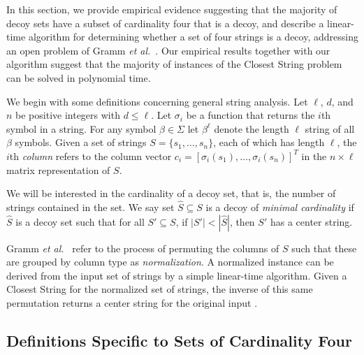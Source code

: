 In this section, we provide empirical evidence suggesting that the majority of decoy sets have a subset of cardinality four that is a decoy, and describe a linear-time algorithm for determining whether a set of four strings is a decoy, addressing an open problem of Gramm {\em et al.}\ \cite{GNR03}. Our empirical results together with our algorithm suggest that the majority of instances of the {\sc Closest String} problem can be solved in polynomial time.

We begin with some definitions concerning general string analysis.  Let $\ell$, $d$, and $n$ be positive integers with $d \leq \ell$. Let $\sigma_i$ be a function that returns the $i$th symbol in a string. For any symbol $\beta \in \Sigma$ let $\beta^{\ell}$ denote the length $\ell$ string of all $\beta$ symbols. Given a set of strings $S = \{ s_1, \ldots, s_n \}$, each of which has length $\ell$, the $i$th {\em column} refers to the column vector $c_i = [\sigma_i(s_1), \ldots, \sigma_i(s_n)]^T$ in the $n \times \ell$ matrix representation of $S$. 

We will be interested in the cardinality of a decoy set, that is, the number of strings contained in the set. We say set $\hat{S} \subseteq S$ is a decoy of {\em minimal cardinality} if $\hat{S}$ is a decoy set such that for all $S' \subseteq S$, if $|S'| < |\hat{S}|$, then $S'$ has a center string. 


Gramm {\em et al.}\ \cite{GNR01} refer to the process of permuting the columns of $S$ such that these are grouped by column type as {\em normalization}. A normalized instance can be derived from the input set of strings by a simple linear-time algorithm.  Given a {\sc Closest String} for the normalized set of strings, the inverse of this same permutation returns
a center string for the original input \cite{GNR01}. 

\subsection{Definitions Specific to Sets of Cardinality Four}
 
